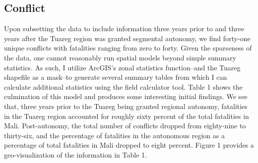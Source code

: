 \documentclass[12pt]{article}
\begin{document}
\subsection{Conflict}
Upon subsetting the data to include information three years prior to and three years after the Tuareg region was granted segmental autonomy, we find forty-one unique conflicts with fatalities ranging from zero to forty. Given the sparseness of the data, one cannot reasonably run spatial models beyond simple summary statistics. As such, I utilize ArcGIS's zonal statistics function--and the Tuareg shapefile as a mask--to generate several summary tables from which I can calculate additional statistics using the field calculator tool. Table 1 shows the culmination of this model and produces some interesting initial findings. We see that, three years prior to the Tuareg being granted regional autonomy, fatalities in the Tuareg region accounted for roughly sixty percent of the total fatalities in Mali. Post-autonomy, the total number of conflicts dropped from eighty-nine to thirty-six, and the percentage of fatalities in the autonomous region as a percentage of total fatalities in Mali dropped to eight percent. Figure 1 provides a geo-visualization of the information in Table 1.

\begin{table}
    \tiny
\begin{center}
\caption{Fatalities in Mali (1997 - 2003)}
\end{center}
\end{table}
\end{document}
